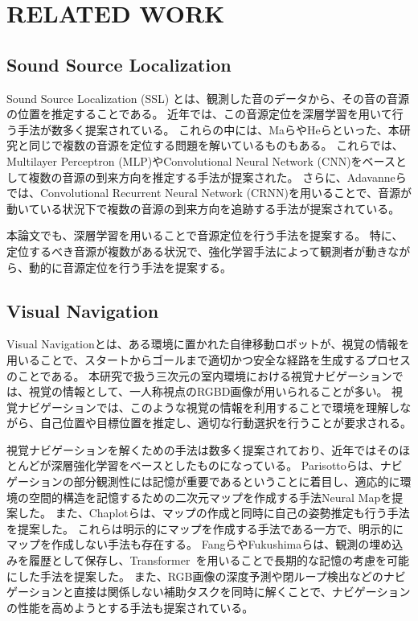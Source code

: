 \section{RELATED WORK}

\subsection{Sound Source Localization}

Sound Source Localization (SSL) とは、観測した音のデータから、その音の音源の位置を推定することである\cite{rascon2017localization}。
近年では、この音源定位を深層学習を用いて行う手法が数多く提案されている\cite{grumiaux2022survey}。
これらの中には、Maら\cite{ma2015exploiting}やHeら\cite{he2018deep}といった、本研究と同じで複数の音源を定位する問題を解いているものもある。
これらでは、Multilayer Perceptron (MLP)やConvolutional Neural Network (CNN)をベースとして複数の音源の到来方向を推定する手法が提案された。
さらに、Adavanneら\cite{adavanne2019localization}では、Convolutional Recurrent Neural Network (CRNN)を用いることで、音源が動いている状況下で複数の音源の到来方向を追跡する手法が提案されている。

本論文でも、深層学習を用いることで音源定位を行う手法を提案する。
特に、定位するべき音源が複数がある状況で、強化学習手法によって観測者が動きながら、動的に音源定位を行う手法を提案する。


\subsection{Visual Navigation}

Visual Navigationとは、ある環境に置かれた自律移動ロボットが、視覚の情報を用いることで、スタートからゴールまで適切かつ安全な経路を生成するプロセスのことである\cite{bonin2008visual}。
本研究で扱う三次元の室内環境における視覚ナビゲーションでは、視覚の情報として、一人称視点のRGBD画像が用いられることが多い。
視覚ナビゲーションでは、このような視覚の情報を利用することで環境を理解しながら、自己位置や目標位置を推定し、適切な行動選択を行うことが要求される。

視覚ナビゲーションを解くための手法は数多く提案されており、近年ではそのほとんどが深層強化学習をベースとしたものになっている。
Parisottoら\cite{DBLP:journals/corr/ParisottoS17}は、ナビゲーションの部分観測性には記憶が重要であるということに着目し、適応的に環境の空間的構造を記憶するための二次元マップを作成する手法Neural Mapを提案した。
また、Chaplotら\cite{chaplot2019learning, chaplot2020object}は、マップの作成と同時に自己の姿勢推定も行う手法を提案した。
これらは明示的にマップを作成する手法である一方で、明示的にマップを作成しない手法も存在する。
Fangら\cite{fang2019scene}やFukushimaら\cite{9812027}は、観測の埋め込みを履歴として保存し、Transformer~\cite{vaswani2017attention}を用いることで長期的な記憶の考慮を可能にした手法を提案した。
また、RGB画像の深度予測や閉ループ検出などのナビゲーションと直接は関係しない補助タスクを同時に解くことで、ナビゲーションの性能を高めようとする手法も提案されている\cite{mirowski2017learning, 9370169}。

